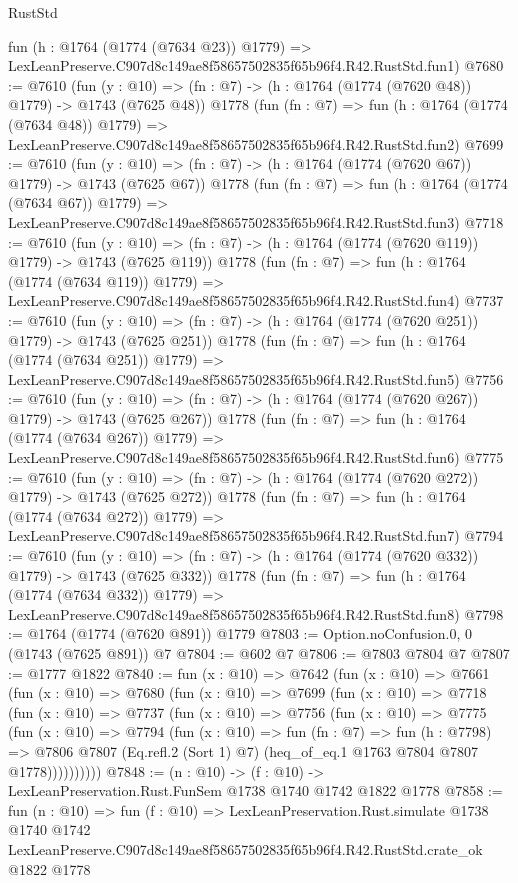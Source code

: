 \begin{lexlean}{RustStd}
\begin{coremodule}
    fun (h : @1764 (@1774 (@7634 @23)) @1779) =>
    LexLeanPreserve.C907d8c149ae8f58657502835f65b96f4.R42.RustStd.fun1)
@7680 := @7610
    (fun (y : @10) => (fn : @7) -> (h : @1764 (@1774 (@7620 @48)) @1779) -> @1743 (@7625 @48))
    @1778
    (fun (fn : @7) =>
    fun (h : @1764 (@1774 (@7634 @48)) @1779) =>
    LexLeanPreserve.C907d8c149ae8f58657502835f65b96f4.R42.RustStd.fun2)
@7699 := @7610
    (fun (y : @10) => (fn : @7) -> (h : @1764 (@1774 (@7620 @67)) @1779) -> @1743 (@7625 @67))
    @1778
    (fun (fn : @7) =>
    fun (h : @1764 (@1774 (@7634 @67)) @1779) =>
    LexLeanPreserve.C907d8c149ae8f58657502835f65b96f4.R42.RustStd.fun3)
@7718 := @7610
    (fun (y : @10) => (fn : @7) -> (h : @1764 (@1774 (@7620 @119)) @1779) -> @1743 (@7625 @119))
    @1778
    (fun (fn : @7) =>
    fun (h : @1764 (@1774 (@7634 @119)) @1779) =>
    LexLeanPreserve.C907d8c149ae8f58657502835f65b96f4.R42.RustStd.fun4)
@7737 := @7610
    (fun (y : @10) => (fn : @7) -> (h : @1764 (@1774 (@7620 @251)) @1779) -> @1743 (@7625 @251))
    @1778
    (fun (fn : @7) =>
    fun (h : @1764 (@1774 (@7634 @251)) @1779) =>
    LexLeanPreserve.C907d8c149ae8f58657502835f65b96f4.R42.RustStd.fun5)
@7756 := @7610
    (fun (y : @10) => (fn : @7) -> (h : @1764 (@1774 (@7620 @267)) @1779) -> @1743 (@7625 @267))
    @1778
    (fun (fn : @7) =>
    fun (h : @1764 (@1774 (@7634 @267)) @1779) =>
    LexLeanPreserve.C907d8c149ae8f58657502835f65b96f4.R42.RustStd.fun6)
@7775 := @7610
    (fun (y : @10) => (fn : @7) -> (h : @1764 (@1774 (@7620 @272)) @1779) -> @1743 (@7625 @272))
    @1778
    (fun (fn : @7) =>
    fun (h : @1764 (@1774 (@7634 @272)) @1779) =>
    LexLeanPreserve.C907d8c149ae8f58657502835f65b96f4.R42.RustStd.fun7)
@7794 := @7610
    (fun (y : @10) => (fn : @7) -> (h : @1764 (@1774 (@7620 @332)) @1779) -> @1743 (@7625 @332))
    @1778
    (fun (fn : @7) =>
    fun (h : @1764 (@1774 (@7634 @332)) @1779) =>
    LexLeanPreserve.C907d8c149ae8f58657502835f65b96f4.R42.RustStd.fun8)
@7798 := @1764 (@1774 (@7620 @891)) @1779
@7803 := Option.noConfusion.{0, 0} (@1743 (@7625 @891)) @7
@7804 := @602 @7
@7806 := @7803 @7804 @7
@7807 := @1777 @1822
@7840 := fun (x : @10) =>
  @7642
    (fun (x : @10) =>
    @7661
      (fun (x : @10) =>
      @7680
        (fun (x : @10) =>
        @7699
          (fun (x : @10) =>
          @7718
            (fun (x : @10) =>
            @7737
              (fun (x : @10) =>
              @7756
                (fun (x : @10) =>
                @7775
                  (fun (x : @10) =>
                  @7794
                    (fun (x : @10) =>
                    fun (fn : @7) =>
                    fun (h : @7798) =>
                    @7806
                      @7807
                      (Eq.refl.{2} (Sort 1) @7)
                      (heq_of_eq.{1} @1763 @7804 @7807 @1778))))))))))
@7848 := (n : @10) -> (f : @10) -> LexLeanPreservation.Rust.FunSem @1738 @1740 @1742 @1822 @1778
@7858 := fun (n : @10) =>
  fun (f : @10) =>
  LexLeanPreservation.Rust.simulate
    @1738
    @1740
    @1742
    LexLeanPreserve.C907d8c149ae8f58657502835f65b96f4.R42.RustStd.crate_ok
    @1822
    @1778
\end{coremodule}
\end{lexlean}
